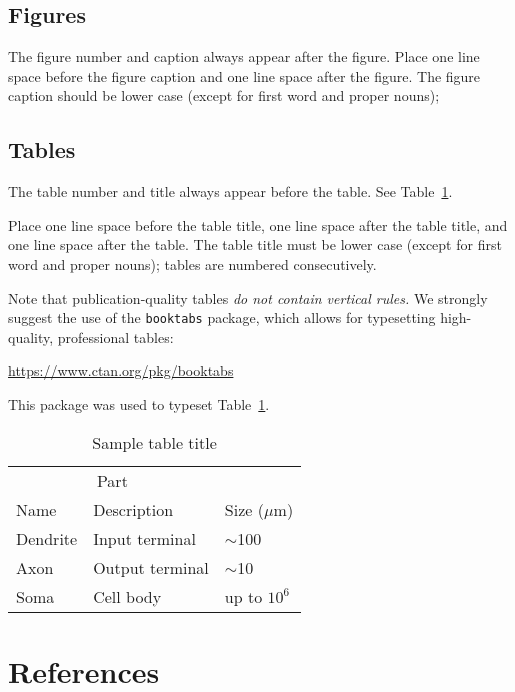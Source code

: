 \documentclass{article}
\begin{document}
\subsection{Figures}

The figure number and caption
always appear after the figure. Place one line space before the figure
caption and one line space after the figure. The figure caption should
be lower case (except for first word and proper nouns); 

\subsection{Tables}

The table
number and title always appear before the table.  See
Table~\ref{sample-table}.

Place one line space before the table title, one line space after the
table title, and one line space after the table. The table title must
be lower case (except for first word and proper nouns); tables are
numbered consecutively.

Note that publication-quality tables \emph{do not contain vertical
  rules.} We strongly suggest the use of the \verb+booktabs+ package,
which allows for typesetting high-quality, professional tables:
\begin{center}
  \url{https://www.ctan.org/pkg/booktabs}
\end{center}
This package was used to typeset Table~\ref{sample-table}.

\begin{table}[t]
  \caption{Sample table title}
  \centering
  \begin{tabular}{lll}
    \toprule
    \multicolumn{2}{c}{Part}                   \\
    \cmidrule{1-2}
    Name     & Description     & Size ($\mu$m) \\
    \midrule
    Dendrite & Input terminal  & $\sim$100     \\
    Axon     & Output terminal & $\sim$10      \\
    Soma     & Cell body       & up to $10^6$  \\
    \bottomrule
  \end{tabular}
  \label{sample-table}
\end{table}

\section{References}


\end{document}
